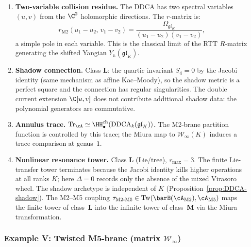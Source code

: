 \begin{computation}
\begin{enumerate}[label=\textup{(\roman*)},nosep]
\item \textbf{Two-variable collision residue.}
 The DDCA has two spectral variables $(u,v)$ from the
 $\C^2$ holomorphic directions. The $r$-matrix is:
 \begin{equation}\label{eq:platonic-r-M2}
 r_{\mathrm{M2}}(u_1 - u_2,\, v_1 - v_2)
 = \frac{\Omega_{\mathfrak{gl}_K}}{(u_1 - u_2)(v_1 - v_2)},
 \end{equation}
 a simple pole in each variable. This is the classical limit of
 the RTT $R$-matrix generating the shifted Yangian
 $Y_\hbar(\mathfrak{gl}_K)$.

\item \textbf{Shadow connection.}
 Class $\mathbf{L}$: the quartic invariant $S_4 = 0$
 by the Jacobi identity (same mechanism as affine Kac--Moody),
 so the shadow metric is a perfect square and the connection
 has regular singularities. The double current extension
 $\C[u,v]$ does not contribute additional shadow data: the
 polynomial generators are commutative.

\item \textbf{Annulus trace.}
 $\mathrm{Tr}_\cA \simeq
 \HH^{\mathrm{ch}}_\bullet(\mathrm{DDCA}_k(\mathfrak{gl}_K))$.
 The M2-brane partition function is controlled by this trace;
 the Miura map to $\mathcal{W}_\infty(K)$ induces a trace
 comparison at genus~$1$.

\item \textbf{Nonlinear resonance tower.}
 Class $\mathbf{L}$ (Lie/tree), $r_{\max} = 3$.
 The finite Lie-transfer tower terminates because the Jacobi identity
 kills higher operations at all ranks $K$; here $\Delta = 0$ records
 only the absence of the mixed Virasoro wheel. The shadow archetype
 is independent of $K$
 \textup{(}Proposition~\textup{\ref{prop:DDCA-shadow}}\textup{)}.
 The M2--M5 coupling
 $\tau_{\mathrm{M2\text{-}M5}} \in \operatorname{Tw}(\barB(\cA_{\mathrm{M2}}), \cA_{\mathrm{M5}})$
 maps the finite tower of class~$\mathbf{L}$ into the infinite
 tower of class~$\mathbf{M}$ via the Miura transformation.
\end{enumerate}
\end{computation}


\subsubsection{Example V: Twisted M5-brane (matrix \texorpdfstring{$\mathcal{W}_\infty$}{W-infinity})}
\label{subsubsec:platonic-M5}

